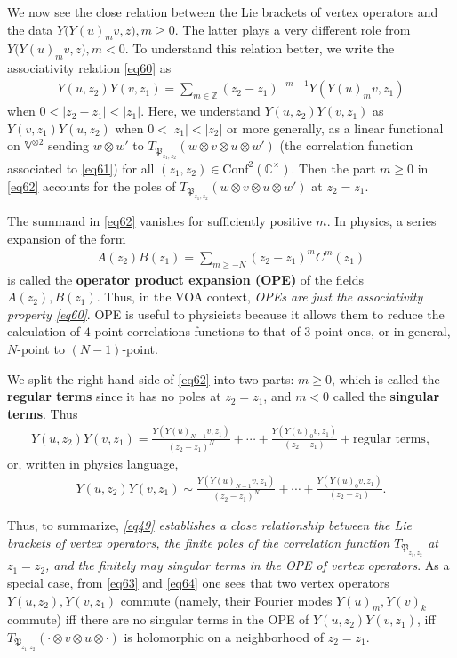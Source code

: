 \documentclass[11pt,b5paper,notitlepage]{article}
\theoremstyle{definition}
\theoremstyle{plain}
\newcommand{\fk}{\mathfrak}
\newcommand{\Conf}{\mathrm{Conf}}
\newcommand{\Vbb}{\mathbb V}
\newcommand{\Cbb}{\mathbb C}
\newcommand{\Zbb}{\mathbb Z}
\numberwithin{equation}{section}
\begin{document}
We now see the close relation between the Lie brackets of vertex operators and the data $Y\big(Y(u)_mv,z\big),m\geq0$. The latter plays a very different role from $Y\big(Y(u)_mv,z\big),m<0$. To understand this relation better, we write the associativity relation \eqref{eq60} as
\begin{align}
Y(u,z_2)Y(v,z_1)=\sum_{m\in\Zbb}(z_2-z_1)^{-m-1}Y(Y(u)_mv,z_1)\label{eq62}	
\end{align}
when $0<|z_2-z_1|<|z_1|$. Here, we understand $Y(u,z_2)Y(v,z_1)$ as $Y(v,z_1)Y(u,z_2)$ when $0<|z_1|<|z_2|$ or more generally, as a linear functional on $\Vbb^{\otimes 2}$ sending $w\otimes w'$ to $T_{\fk P_{z_1,z_2}}(w\otimes v\otimes u\otimes w')$ (the correlation function associated to \eqref{eq61}) for all $(z_1,z_2)\in\Conf^2(\Cbb^\times)$. Then the part $m\geq 0$ in \eqref{eq62} accounts for the poles of $T_{\fk P_{z_1,z_2}}(w\otimes v\otimes u\otimes w')$ at $z_2=z_1$.

The summand in \eqref{eq62} vanishes for sufficiently positive $m$. In physics, a series expansion of the form
\begin{align*}
	A(z_2)B(z_1)=\sum_{m\geq -N}(z_2-z_1)^mC^m(z_1)
\end{align*}
is called the  \textbf{operator product expansion (OPE)} of the fields $A(z_2),B(z_1)$. Thus, in the VOA context, \emph{OPEs are just the associativity property \eqref{eq60}}. OPE is useful to physicists because it allows them to reduce the calculation of $4$-point correlations functions to that of $3$-point ones, or in general, $N$-point to $(N-1)$-point.

We split the right hand side of \eqref{eq62} into two parts: $m\geq 0$, which is called the \textbf{regular terms} since it has no poles at $z_2=z_1$, and $m<0$ called the \textbf{singular terms}. Thus
\begin{align*}
Y(u,z_2)Y(v,z_1)=\frac{Y(Y(u)_{N-1}v,z_1)}{(z_2-z_1)^N}+\cdots+	\frac{Y(Y(u)_0v,z_1)}{(z_2-z_1)}+\text{regular terms},
\end{align*}
or, written in physics language,
\begin{align}
	Y(u,z_2)Y(v,z_1)\sim\frac{Y(Y(u)_{N-1}v,z_1)}{(z_2-z_1)^N}+\cdots+	\frac{Y(Y(u)_0v,z_1)}{(z_2-z_1)}.
\end{align}

Thus, to summarize, \emph{\eqref{eq49} establishes a close relationship between the Lie brackets of vertex operators,  the finite poles of the correlation function $T_{\fk P_{z_1,z_2}}$ at $z_1=z_2$, and the finitely may singular terms in the OPE of vertex operators}. As a special case, from \eqref{eq63} and \eqref{eq64} one sees that two vertex operators $Y(u,z_2),Y(v,z_1)$ commute (namely, their Fourier modes $Y(u)_m,Y(v)_k$ commute) iff there are no singular terms in the OPE of $Y(u,z_2)Y(v,z_1)$, iff $T_{\fk P_{z_1,z_2}}(\cdot\otimes v\otimes u\otimes\cdot)$ is holomorphic on a neighborhood of $z_2=z_1$. 
\end{document}
